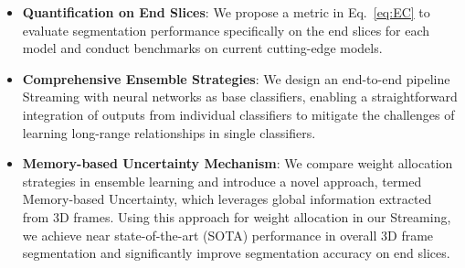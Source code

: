 \begin{itemize}
\item \textbf{Quantification on End Slices}: We propose a metric in Eq.~\ref{eq:EC} to evaluate segmentation performance specifically on the end slices for each model and conduct benchmarks on current cutting-edge models.

\item \textbf{Comprehensive Ensemble Strategies}: We design an end-to-end pipeline Streaming with neural networks as base classifiers, enabling a straightforward integration of outputs from individual classifiers to mitigate the challenges of learning long-range relationships in single classifiers.

\item \textbf{Memory-based Uncertainty Mechanism}: We compare weight allocation strategies in ensemble learning and introduce a novel approach, termed Memory-based Uncertainty, which leverages global information extracted from 3D frames. Using this approach for weight allocation in our Streaming, we achieve near state-of-the-art (SOTA) performance in overall 3D frame segmentation and significantly improve segmentation accuracy on end slices.

\end{itemize}